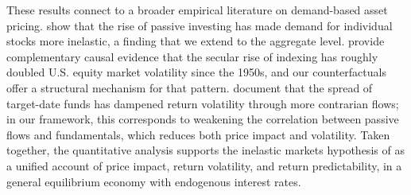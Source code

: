 \documentclass[12pt,english]{article}
\begin{document}
These results connect to a broader empirical literature on demand-based asset pricing.
\citet{HHM/2021} show that the rise of passive investing has made demand for individual stocks more inelastic, a finding that we extend to the aggregate level.
\citet{lochstoerMuir2026} provide complementary causal evidence that the secular rise of indexing has roughly doubled U.S. equity market volatility since the 1950s, and our counterfactuals offer a structural mechanism for that pattern.
\citet{parker2023retail} document that the spread of target-date funds has dampened return volatility through more contrarian flows; in our framework, this corresponds to weakening the correlation between passive flows and fundamentals, which reduces both price impact and volatility.
Taken together, the quantitative analysis supports the inelastic markets hypothesis of \citet{gabaix2020search} as a unified account of price impact, return volatility, and return predictability, in a general equilibrium economy with endogenous interest rates.
\end{document}
